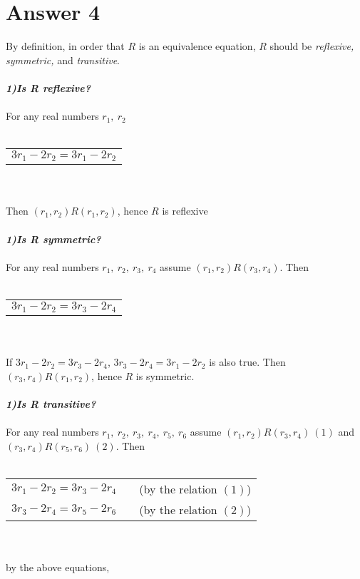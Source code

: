 \documentclass[12pt]{article}
\begin{document}
\section*{Answer 4}
By definition, in order that $R$ is an equivalence equation, $R$ should be 
\textit{reflexive, symmetric,} and \textit{transitive}. 
\\ \\
\textit{\textbf{1)Is R reflexive?}}
\\ \\
For any real numbers $r_1,\ r_2$
\\ \\
\begin{tabular}{l}
    $3r_1-2r_2=3r_1-2r_2$\\
\end{tabular}
\\ \\
Then $(r_1,r_2)R(r_1,r_2)$, hence $R$ is reflexive
\\ \\
\textit{\textbf{1)Is R symmetric?}}
\\ \\
For any real numbers $r_1,\ r_2,\ r_3,\ r_4$ assume $(r_1,r_2)R(r_3,r_4)$. Then
\\ \\
\begin{tabular}{l}
    $3r_1-2r_2=3r_3-2r_4$\\
\end{tabular}
\\ \\
If $3r_1-2r_2=3r_3-2r_4$, $3r_3-2r_4=3r_1-2r_2$ is also true. Then
$(r_3,r_4)R(r_1,r_2)$, hence $R$ is symmetric.
\\ \\
\textit{\textbf{1)Is R transitive?}}
\\ \\
For any real numbers $r_1,\ r_2,\ r_3,\ r_4,\ r_5,\ r_6$ assume 
$(r_1,r_2)R(r_3,r_4)\ (1)$ and $(r_3,r_4)R(r_5,r_6)\ (2)$. Then
\\ \\
\begin{tabular}{l l l}
    $3r_1-2r_2=3r_3-2r_4$ & & (by the relation $(1)$)\\
    $3r_3-2r_4=3r_5-2r_6$ & & (by the relation $(2)$)\\
\end{tabular}
\\ \\
by the above equations,
\\ \\
\end{document}
